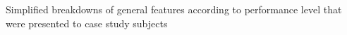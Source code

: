 Simplified breakdowns of general features according to performance level that were presented to case study subjects
\label{fig:breakdown_performanceclass}